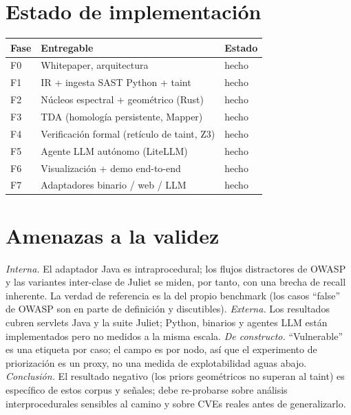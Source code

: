 \documentclass[11pt]{article}
\begin{document}
\section{Estado de implementación}
\begin{center}
\begin{tabular}{lll}
\toprule
Fase & Entregable & Estado \\
\midrule
F0 & Whitepaper, arquitectura & hecho \\
F1 & IR + ingesta SAST Python + taint & hecho \\
F2 & Núcleos espectral + geométrico (Rust) & hecho \\
F3 & TDA (homología persistente, Mapper) & hecho \\
F4 & Verificación formal (retículo de taint, Z3) & hecho \\
F5 & Agente LLM autónomo (LiteLLM) & hecho \\
F6 & Visualización + demo end-to-end & hecho \\
F7 & Adaptadores binario / web / LLM & hecho \\
\bottomrule
\end{tabular}
\end{center}

\section{Amenazas a la validez}
\emph{Interna.} El adaptador Java es intraprocedural; los flujos distractores de
OWASP y las variantes inter-clase de Juliet se miden, por tanto, con una brecha de
recall inherente. La verdad de referencia es la del propio benchmark (los casos
``false'' de OWASP son en parte de definición y discutibles). \emph{Externa.} Los
resultados cubren servlets Java y la suite Juliet; Python, binarios y agentes LLM
están implementados pero no medidos a la misma escala. \emph{De constructo.}
``Vulnerable'' es una etiqueta por caso; el campo es por nodo, así que el
experimento de priorización es un proxy, no una medida de explotabilidad aguas
abajo. \emph{Conclusión.} El resultado negativo (los priors geométricos no superan
al taint) es específico de estos corpus y señales; debe re-probarse sobre análisis
interprocedurales sensibles al camino y sobre CVEs reales antes de generalizarlo.
\end{document}
